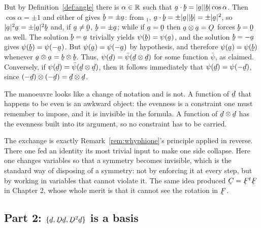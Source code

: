 But by Definition~\ref{def:angle} there is $\alpha\in\mathbb{R}$ such that
$\ip\ba\bb=|\ba||\bb|\cos\alpha$. Then $\cos\alpha=\pm1$ and either of
 gives $\bb=\pm\ba$: from $_{1}$,
$\ip\ba\bb=\pm|\ba||\bb|=\pm|\ba|^{2}$, so
$|\ba|^{2}\ba=\pm|\ba|^{2}\bb$ and, if $\ba\neq\bze$, $\bb=\pm\ba$;
while if $\ba=\bze$ then $\ba\otimes\ba=\Ob$ forces $\bb=\bze$ as well.
The solution $\bb=\ba$ trivially yields $\psi(\bb)=\psi(\ba)$, and the
solution $\bb=-\ba$ gives $\psi(\bb)=\psi(-\ba)$. But
$\psi(\ba)=\psi(-\ba)$ by hypothesis, and therefore
$\psi(\ba)=\psi(\bb)$ whenever $\ba\otimes\ba=\bb\otimes\bb$. Thus,
$\psi(\bd)=\bar\psi(\bd\otimes\bd)$ for some function $\bar\psi$, as
claimed. Conversely, if $\psi(\bd)=\bar\psi(\bd\otimes\bd)$, then it
follows immediately that $\psi(\bd)=\psi(-\bd)$, since
$(-\bd)\otimes(-\bd)=\bd\otimes\bd$.

\begin{remark}
\label{rem:ch9dyad}
The manoeuvre looks like a change of notation and is not. A function of
$\bd$ that happens to be even is an awkward object: the evenness is a
constraint one must remember to impose, and it is invisible in the
formula. A function of $\bd\otimes\bd$ has the evenness built into its
argument, so no constraint has to be carried.

The exchange is exactly Remark~\ref{rem:whyphione}'s principle applied
in reverse. There one fed an identity its most trivial input to make one
side collapse. Here one changes variables so that a symmetry becomes
invisible, which is the standard way of disposing of a symmetry: not by
enforcing it at every step, but by working in variables that cannot
violate it. The same idea produced $\bC=\bF^{t}\bF$ in Chapter 2, whose
whole merit is that it cannot see the rotation in $\bF$.
\end{remark}

\subsection*{Part 2: $\{\bd,\bD\bd,\bD^{2}\bd\}$ is a basis}

